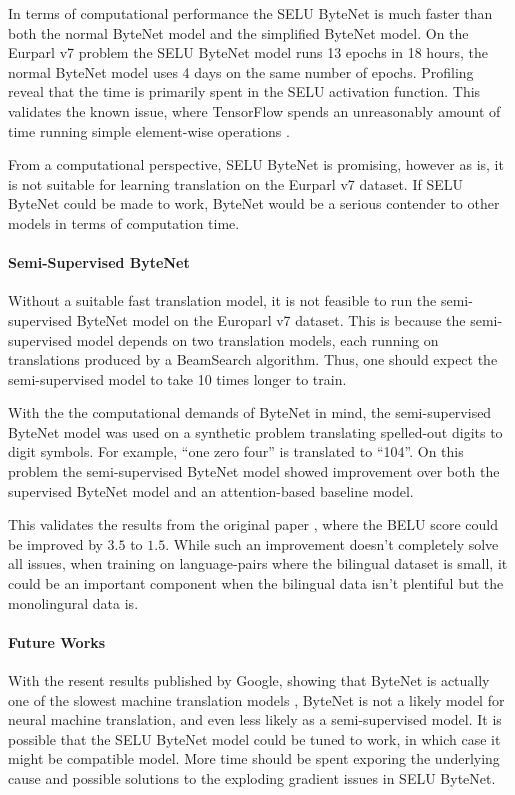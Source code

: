 In terms of computational performance the SELU ByteNet is much faster than both the normal ByteNet model and the simplified ByteNet model. On the Eurparl v7 problem the SELU ByteNet model runs 13 epochs in 18 hours, the normal ByteNet model uses 4 days on the same number of epochs. Profiling reveal that the time is primarily spent in the SELU activation function. This validates the known issue, where TensorFlow spends an unreasonably amount of time running simple element-wise operations \cite{google-xla}.

From a computational perspective, SELU ByteNet is promising, however as is, it is not suitable for learning translation on the Eurparl v7 dataset. If SELU ByteNet could be made to work, ByteNet would be a serious contender to other models in terms of computation time.

\paragraph{Semi-Supervised ByteNet} Without a suitable fast translation model, it is not feasible to run the semi-supervised ByteNet model on the Europarl v7 dataset. This is because the semi-supervised model depends on two translation models, each running on translations produced by a BeamSearch algorithm. Thus, one should expect the semi-supervised model to take 10 times longer to train. 

With the the computational demands of ByteNet in mind, the semi-supervised ByteNet model was used on a synthetic problem translating spelled-out digits to digit symbols. For example, ``one zero four'' is translated to ``104''. On this problem the semi-supervised ByteNet model showed improvement over both the supervised ByteNet model and an attention-based baseline model.

This validates the results from the original paper \cite{semi-supervised}, where the BELU score could be improved by $3.5$ to $1.5$. While such an improvement doesn't completely solve all issues, when training on language-pairs where the bilingual dataset is small, it could be an important component when the bilingual data isn't plentiful but the monolingural data is.


\paragraph{Future Works} With the resent results published by Google, showing that ByteNet is actually one of the slowest machine translation models \cite{tensor2tensor}, ByteNet is not a likely model for neural machine translation, and even less likely as a semi-supervised model. It is possible that the SELU ByteNet model could be tuned to work, in which case it might be compatible model. More time should be spent exporing the underlying cause and possible solutions to the exploding gradient issues in SELU ByteNet.

